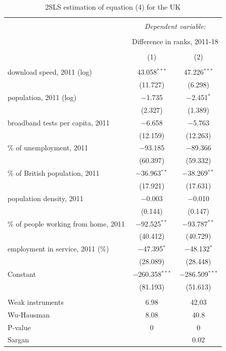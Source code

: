 \documentclass[10pt,letterpaper]{article}
\begin{document}
\begin{table}[!htbp] \centering 
  \caption{2SLS estimation of equation (4) for the UK\label{2sls.uk}} 
  \label{} 
\small 
\begin{tabular}{@{\extracolsep{5pt}}lcc} 
\\[-1.8ex]\hline 
\hline \\[-1.8ex] 
 & \multicolumn{2}{c}{\textit{Dependent variable:}} \\ 
\cline{2-3} 
\\[-1.8ex] & \multicolumn{2}{c}{Difference in ranks, 2011-18} \\ 
\\[-1.8ex] & (1) & (2)\\ 
\hline \\[-1.8ex] 
 download speed, 2011 (log) & 43.058$^{***}$ & 47.226$^{***}$ \\ 
  & (11.727) & (6.298) \\ 
  population, 2011 (log) & $-$1.735 & $-$2.451$^{*}$ \\ 
  & (2.327) & (1.389) \\ 
  broadband tests per capita, 2011 & $-$6.658 & $-$5.763 \\ 
  & (12.159) & (12.263) \\ 
  \% of unemployment, 2011 & $-$93.185 & $-$89.366 \\ 
  & (60.397) & (59.332) \\ 
  \% of British population, 2011 & $-$36.963$^{**}$ & $-$38.269$^{**}$ \\ 
  & (17.921) & (17.631) \\ 
  population density, 2011 & $-$0.003 & $-$0.010 \\ 
  & (0.144) & (0.147) \\ 
  \% of people working from home, 2011 & $-$92.525$^{**}$ & $-$93.787$^{**}$ \\ 
  & (40.412) & (40.729) \\ 
  employment in service, 2011 (\%) & $-$47.395$^{*}$ & $-$48.132$^{*}$ \\ 
  & (28.089) & (28.448) \\ 
  Constant & $-$260.358$^{***}$ & $-$286.509$^{***}$ \\ 
  & (81.193) & (51.613) \\ 
 \hline \\[-1.8ex] 
Weak instruments & 6.98 & 42.03 \\ 
Wu-Hausman & 8.08 & 40.8 \\ 
P-value & 0 & 0 \\ 
Sargan &  & 0.02 \\ 

\end{tabular}
\end{table}
\end{document}
